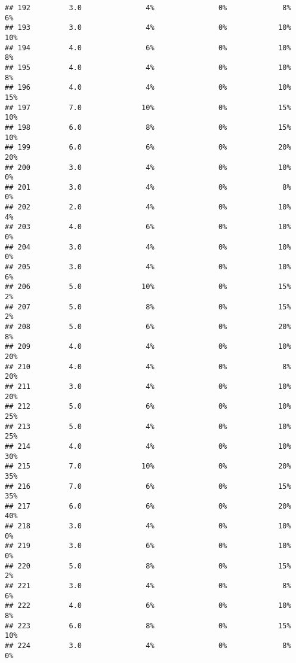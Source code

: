 \documentclass[
]{article}
\begin{document}
\begin{verbatim}
## 192         3.0               4%               0%             8%          6%
## 193         3.0               4%               0%            10%         10%
## 194         4.0               6%               0%            10%          8%
## 195         4.0               4%               0%            10%          8%
## 196         4.0               4%               0%            10%         15%
## 197         7.0              10%               0%            15%         10%
## 198         6.0               8%               0%            15%         10%
## 199         6.0               6%               0%            20%         20%
## 200         3.0               4%               0%            10%          0%
## 201         3.0               4%               0%             8%          0%
## 202         2.0               4%               0%            10%          4%
## 203         4.0               6%               0%            10%          0%
## 204         3.0               4%               0%            10%          0%
## 205         3.0               4%               0%            10%          6%
## 206         5.0              10%               0%            15%          2%
## 207         5.0               8%               0%            15%          2%
## 208         5.0               6%               0%            20%          8%
## 209         4.0               4%               0%            10%         20%
## 210         4.0               4%               0%             8%         20%
## 211         3.0               4%               0%            10%         20%
## 212         5.0               6%               0%            10%         25%
## 213         5.0               4%               0%            10%         25%
## 214         4.0               4%               0%            10%         30%
## 215         7.0              10%               0%            20%         35%
## 216         7.0               6%               0%            15%         35%
## 217         6.0               6%               0%            20%         40%
## 218         3.0               4%               0%            10%          0%
## 219         3.0               6%               0%            10%          0%
## 220         5.0               8%               0%            15%          2%
## 221         3.0               4%               0%             8%          6%
## 222         4.0               6%               0%            10%          8%
## 223         6.0               8%               0%            15%         10%
## 224         3.0               4%               0%             8%          0%

\end{verbatim}
\end{document}
